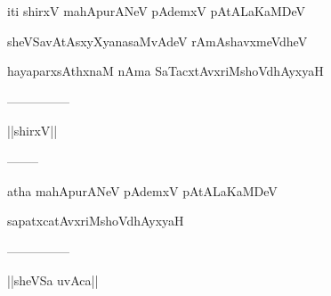 \documentclass{article}
\begin{document}
\begin{center}
iti shirxV mahApurANeV pAdemxV pAtALaKaMDeV
\end{center}

\begin{center}
sheVSavAtAsxyXyanasaMvAdeV rAmAshavxmeVdheV
\end{center}

\begin{center}
hayaparxsAthxnaM nAma SaTacxtAvxriMshoVdhAyxyaH
\end{center}

\begin{center}
---------------
\end{center}

\begin{center}
||shirxV||
\end{center}

\begin{center}
--------
\end{center}

\begin{center}
atha mahApurANeV pAdemxV pAtALaKaMDeV
\end{center}

\begin{center}
sapatxcatAvxriMshoVdhAyxyaH
\end{center}

\begin{center}
---------------
\end{center}

\begin{center}
||sheVSa uvAca||
\end{center}
\end{document}
